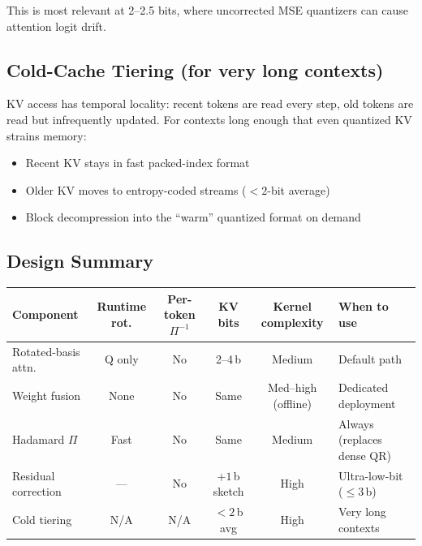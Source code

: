\documentclass[nobib]{tufte-handout}
\begin{document}
This is most relevant at 2--2.5 bits, where uncorrected MSE quantizers can cause attention logit drift.


\subsection{Cold-Cache Tiering (for very long contexts)}

KV access has temporal locality: recent tokens are read every step, old tokens are read but infrequently updated. For contexts long enough that even quantized KV strains memory:
\begin{itemize}
  \item Recent KV stays in fast packed-index format
  \item Older KV moves to entropy-coded streams ($<2$-bit average)
  \item Block decompression into the ``warm'' quantized format on demand
\end{itemize}



\subsection{Design Summary}

\smallskip
\begin{fullwidth}
\small
\begin{tabular}{@{}lccccl@{}}
\toprule
\textbf{Component} & \textbf{Runtime rot.} & \textbf{Per-token $\Pi^{-1}$} & \textbf{KV bits} & \textbf{Kernel complexity} & \textbf{When to use} \\
\midrule
Rotated-basis attn.   & Q only     & No & 2--4\,b & Medium & Default path \\
Weight fusion          & None       & No & Same    & Med--high (offline) & Dedicated deployment \\
Hadamard $\Pi$         & Fast       & No & Same    & Medium & Always (replaces dense QR) \\
Residual correction    & ---        & No & $+1$\,b sketch & High & Ultra-low-bit (${\le}3$\,b) \\
Cold tiering           & N/A        & N/A & ${<}2$\,b avg & High & Very long contexts \\
\bottomrule
\end{tabular}
\end{fullwidth}
\end{document}
